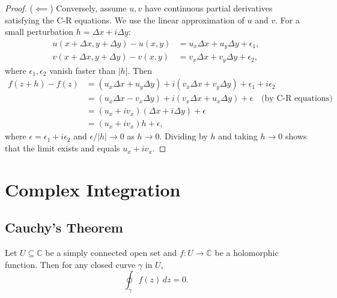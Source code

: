\begin{proof}
  ($\impliedby$) Conversely, assume $u, v$ have continuous partial derivatives satisfying the C-R equations.
  We use the linear approximation of $u$ and $v$. For a small perturbation $h = \Delta x + i\Delta y$:
  \begin{align*}
    u(x+\Delta x, y+\Delta y) - u(x,y) & = u_x \Delta x + u_y \Delta y + \epsilon_1, \\
    v(x+\Delta x, y+\Delta y) - v(x,y) & = v_x \Delta x + v_y \Delta y + \epsilon_2,
  \end{align*}
  where $\epsilon_1, \epsilon_2$ vanish faster than $|h|$.
  Then
  \begin{align*}
    f(z+h) - f(z) & = (u_x \Delta x + u_y \Delta y) + i(v_x \Delta x + v_y \Delta y) + \epsilon_1 + i\epsilon_2                 \\
                  & = (u_x \Delta x - v_x \Delta y) + i(v_x \Delta x + u_x \Delta y) + \epsilon \quad \text{(by C-R equations)} \\
                  & = (u_x + i v_x)(\Delta x + i\Delta y) + \epsilon                                                            \\
                  & = (u_x + i v_x) h + \epsilon,
  \end{align*}
  where $\epsilon = \epsilon_1 + i\epsilon_2$ and $\epsilon/|h| \to 0$ as $h \to 0$.
  Dividing by $h$ and taking $h \to 0$ shows that the limit exists and equals $u_x + i v_x$.
\end{proof}

\chapter{Complex Integration}

\section{Cauchy's Theorem}

\begin{theorem}
  Let $U \subseteq \mathbb{C}$ be a simply connected open set and $f : U \to \mathbb{C}$ be a holomorphic function.
  Then for any closed curve $\gamma$ in $U$,
  \begin{equation}
    \oint_{\gamma} f(z) \, dz = 0.
  \end{equation}
\end{theorem}

